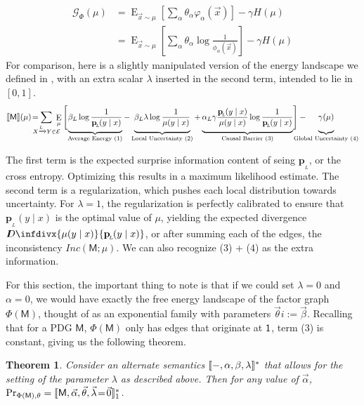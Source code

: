 \documentclass{article}
\theoremstyle{plain}
\newtheorem{theorem}{Theorem}[section]
\theoremstyle{definition}
\theoremstyle{remark}
\newcommand{\thickD}{I\mkern-8muD}
\newcommand{\kldiv}{\thickD\infdivx}%
\DeclarePairedDelimiter{\bbr}{\llbracket}{\rrbracket}
\let\H\relax
\DeclareMathOperator{\H}{\mathrm{H}} %
\DeclareMathOperator{\E}{\mathrm{E}} %
\newcommand\mat[1]{\mathbf{#1}}
\DeclarePairedDelimiter{\UD}{\llbracket}{\rrbracket^*}
\newcommand{\bp}[1][L]{\mat{p}_{\!_{#1}\!}}
\newcommand{\Ed}{\mathcal E}
\newcommand{\sfM}{\mathsf M}
\newcommand\inconsist{\mathit{Inc}}
\numberwithin{equation}{section}
\begin{document}
	\begin{align*}
		\mathcal G_\Phi(\mu) &=  \E_{\vec x \sim \mu} \left[\sum_\alpha \theta_\alpha \varphi_\alpha(\vec x) \right] - \gamma H(\mu) \\
			&= \E_{\vec x \sim \mu} \left[\sum_\alpha \theta_\alpha \log \frac{1}{\phi_\alpha(\vec x)} \right] - \gamma H(\mu)
	\end{align*}
	For comparison, here is a slightly manipulated version of the energy landscape we defined in , with an extra scalar $\lambda$ inserted in the second term, intended to lie in $[0,1]$.
	\begin{equation*}
		\bbr{\sfM}(\mu) \!=\mskip-18mu \sum_{ X \xrightarrow{\!\!L} Y  \in \Ed } \!\!\!\!\E_\mu  \Bigg[\!
			\underbrace{\beta_L \log \frac{1}{\bp(y\mid x)} \vphantom{\Bigg|}}_{\text{Average Energy (1)}}  - 
			\underbrace{\beta_L \lambda \log \frac{1}{\mu(y \mid x)}  \vphantom{\Bigg|}}_{\text{Local Uncertainty (2)}}  + 
			\underbrace{\alpha_L \gamma \frac{\bp(y \mid x)}{\mu(y \mid x)}\log \frac{1}{\bp(y\mid x)}  \vphantom{\Bigg|}}_{\text{Causal Barrier (3)}}\! \Bigg] - 
			\mskip-31mu\underbrace{\gamma \H(\mu) \vphantom{\Bigg|} }_{\text{Global Uncertainty (4)}}
	\end{equation*}

	The first term is the expected surprise information content of seing $\bp$, or the cross entropy. Optimizing this results in a maximum likelihood estimate. The second term is a regularization, which pushes each local distribution towards uncertainty. For $\lambda = 1$, the regularization is perfectly calibrated to ensure that $\bp(y \mid x)$ is the optimal value of $\mu$, yielding the expected divergence $\kldiv{\mu(y\mid x)}{\bp(y\mid x)}$, or after summing each of the edges, the inconsistency $\inconsist(\sfM ; \mu)$. We can also recognize (3) + (4) as the extra information.
	
	For this section, the important thing to note is that if we could set $\lambda = 0$ and $\alpha = 0$, we would have exactly the free energy landscape of the factor graph $\Phi(\sfM)$, thought of as an exponential family with parameters $\vec \theta i:= \vec \beta$. Recalling that for a PDG $\sfM$, $\Phi(\sfM)$ only has edges that originate at $\sf 1$, term (3) is constant, giving us the following theorem.
	
	\begin{theorem}
		Consider an alternate semantics $\UD{-, \alpha, \beta, \lambda}$ that allows for the setting of the parameter $\lambda$ as described above. Then for any value of $\vec\alpha$, $\Pr_{\Phi(\sfM),\theta} = \UD{\sfM, \vec{\alpha}, \vec{\theta}, \vec\lambda \!=\! \vec 0 }_1$.
	\end{theorem}
\end{document}
